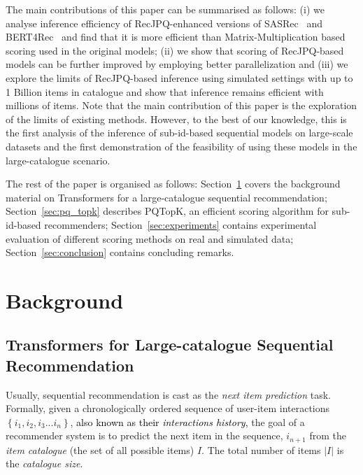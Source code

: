 \documentclass[sigconf,natbib=true, review=true]{acmart} %
\newcommand{\nt}[1]{\textcolor{black}{#1}}
\begin{document}
The main contributions of this paper can be summarised as follows: (i) we analyse inference efficiency of RecJPQ-enhanced versions of SASRec~\cite{SASRec} and BERT4Rec~\cite{BERT4Rec} and find that it is more efficient than Matrix-Multiplication based scoring used in the original models; (ii) we show that scoring of RecJPQ-based models can be further improved by employing better parallelization and (iii) we explore the limits of RecJPQ-based inference using simulated settings with up to 1 Billion items in catalogue and show that inference remains efficient with millions of items.
Note that the main contribution of this paper is the exploration of the limits of existing methods. However, to the best of our knowledge, this is the first analysis of the inference of sub-id-based sequential models on large-scale datasets and the first demonstration of the feasibility of using these models in the large-catalogue scenario. 

The rest of the paper is organised as follows: Section~\ref{ssec:recsys:preliminarilies} covers the background material on Transformers for a large-catalogue sequential recommendation; Section~\ref{sec:pq_topk} describes PQTopK, an efficient scoring algorithm for sub-id-based recommenders; Section~\ref{sec:experiments} contains experimental evaluation of different scoring methods on real and simulated data; Section~\ref{sec:conclusion} contains concluding remarks. 


\section{Background} \label{ssec:recsys:preliminarilies}
\subsection{Transformers for Large-catalogue Sequential Recommendation}\label{sec:rec}

 Usually, sequential recommendation is cast as the \emph{next item prediction} task. Formally, given a chronologically ordered sequence of user-item interactions $\left\{i_1, i_2, i_3 ... i_n\right\}$, \nt{also known as their \textit{interactions history},} the goal of a recommender system is to predict the next item in the sequence, $i_{n+1}$ from the \emph{item catalogue} (the set of all possible items) $I$. The total number of items $|I|$ is the \emph{catalogue size}.
\end{document}
